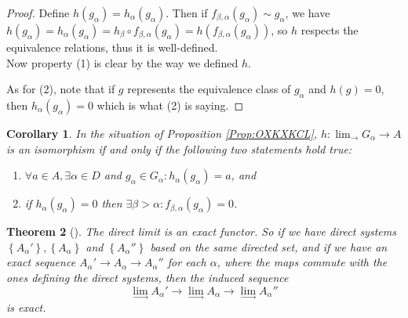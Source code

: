 \documentclass[reqno]{amsart}
\newtheorem{theorem}{Theorem}[section]
\newtheorem{corollary}[theorem]{Corollary}
\theoremstyle{definition}
\theoremstyle{remark}
\begin{document}
\begin{proof}
    Define $h (g_{\alpha}) = 
    h_{\alpha}(g_{\alpha})$. Then if
    $f_{\beta,\alpha}(g_{\alpha}) \sim g_{\alpha}$, we have
    $h\left( g_{\alpha} \right) 
    = h_{\alpha}\left( g_{\alpha} \right) 
    = h_{\beta} \circ f_{\beta,\alpha}(g_{\alpha})
    = h \left( f_{\beta,\alpha}(g_{\alpha}) \right) $, so
    $h$ respects the equivalence relations, thus it
    is well-defined.\\
    Now property (1) is clear by the way we defined $h$.

    As for (2), note that 
    if $g$ represents the equivalence class
    of $g_{\alpha}$ and
    $h(g) = 0$, then
    $h_{\alpha}\left( g_{\alpha} \right) = 0$ which
    is what (2) is saying.
\end{proof}

\begin{corollary}
    In the situation of Proposition
    \ref{Prop:OXKXKCL},
    $h \colon \lim_{\rightarrow} G_{\alpha} \to A$ is an
    isomorphism if and only if the following two statements
    hold true:
    \begin{enumerate}
        \item $\forall a \in A, \exists \alpha \in D$ and
            $g_{\alpha} \in G_{\alpha} \colon
            h_{\alpha}(g_{\alpha}) = a$, and
        \item if $h_{\alpha}(g_{\alpha}) = 0$ then
            $\exists \beta > \alpha \colon f_{\beta,\alpha}
            (g_{\alpha}) = 0$.
    \end{enumerate}
\end{corollary}

\begin{theorem}[]\label{Thm:Direct-Limit-Functor}
    The direct limit is an exact functor.
    So if we have direct systems
    $\left\{ A_{\alpha}' \right\} ,
    \left\{ A_{\alpha} \right\} $ and
    $\left\{ A_{\alpha}'' \right\} $ based on the same
    directed set, and if we have
    an exact sequence
    $A_{\alpha}' \to A_{\alpha} \to A_{\alpha}''$ for each
    $\alpha$, where the maps commute with the ones
    defining the direct systems, then the induced sequence
    \[
    \lim_{\rightarrow} A_{\alpha}' \to 
    \lim_{\rightarrow} A_{\alpha} \to 
    \lim_{\rightarrow} A_{\alpha}''
    \] 
    is exact.
\end{theorem}
\end{document}
